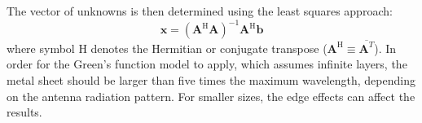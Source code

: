 


The vector of unknowns is then determined using the least squares approach:
\begin{equation}
\mathbf{x}=\left(\mathbf{A}^{\text{H}}\mathbf{A}\right)^{-1}\mathbf{A}^{\text{H}}\mathbf{b}
\end{equation}
where symbol H denotes the Hermitian or conjugate transpose
($\mathbf{A}^{\text{H}}\equiv\overline{\mathbf{A}^{T}}$). In order for the Green's function model to apply, which assumes infinite layers, the metal sheet should be larger than five times the maximum wavelength, depending on the antenna radiation pattern. For smaller sizes, the edge effects can affect the results.

